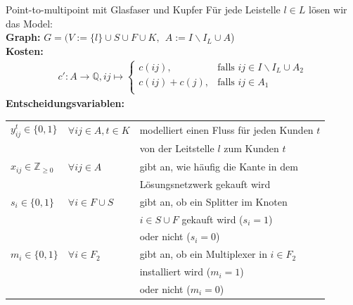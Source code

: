 \documentclass{beamer}
\newcommand{\Q}{\mathbb{Q}}
\newcommand{\Z}{\mathbb{Z}}
\begin{document}
\begin{frame}{Point-to-multipoint mit Glasfaser und Kupfer}
	F\"ur jede Leistelle $l \in L$ l\"osen wir das Model: \\
	\vspace{0.2cm}
	\textbf{Graph:}  $G=(V:=\{l\}\cup S \cup F \cup K ,\: \:   A:= I\backslash I_L \cup A$)\\
	\textbf{Kosten:}
	\begin{align*}
	c': A \rightarrow \Q, ij  \mapsto \left\{\begin{array}{cl} 
	c(ij), & \text{falls } ij \in I\backslash I_L \cup A_2\\ 
	c(ij)+c(j), & \text{falls } ij \in A_1\\ 
	\end{array}
	\right.
	\end{align*}
	\textbf{Entscheidungsvariablen:}\\
	\begin{tabular}{lll}
		$y_{ij}^t \in \{0,1\}$ &$\forall ij \in A, t\in K $ & modelliert einen Fluss für jeden Kunden $t$ \\
		&&von der Leitstelle $l$ zum Kunden $t$\\
		$x_{ij} \in \Z_{\geq 0}$ & $\forall ij \in A$ &gibt an, wie häufig die Kante in dem \\
		&&Lösungsnetzwerk gekauft wird\\
		$s_i \in \{0,1\}$ & $\forall i \in F \cup S$ & gibt an, ob ein Splitter im Knoten \\
		&&$i\in S \cup F$ gekauft wird ($s_i=1$)\\
		&&oder nicht ($s_i=0$)\\
		$m_i \in \{0,1\}$ & $\forall i \in F_2$ & gibt an, ob ein Multiplexer in $i\in F_2$\\
		&& installiert wird ($m_i=1$) \\
		&&oder nicht ($m_i=0$)
	\end{tabular}
\end{frame}
\end{document}
